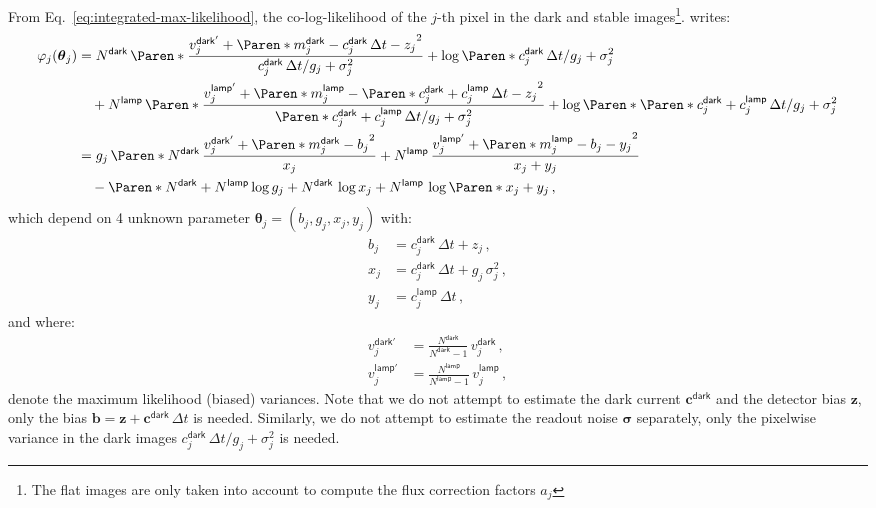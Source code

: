 \documentclass[a4paper,11pt,twoside]{scrartcl}
\newcommand*{\Tag}[1]{\mathsf{#1}}
\newcommand*{\V}[1]{\boldsymbol{#1}}   %
\theoremstyle{plain} %
\theoremstyle{definition}
\theoremstyle{remark}
\begin{document}
From Eq.~\eqref{eq:integrated-max-likelihood}, the co-log-likelihood of the
$j$-th pixel in the dark and stable images\footnote{The flat images are only
  taken into account to compute the flux correction factors $a_j$}. writes:
\begin{align}
  \varphi_j(\V\theta_j)
  &= N^\Tag{dark}\,\Paren*{
    \frac{
      v^\Tag{dark'}_j +
      \Paren*{m^\Tag{dark}_j - c^\Tag{dark}_j\,\Delta t - z_j}^2
    }{
      c^\Tag{dark}_j\,\Delta t/g_j + \sigma^2_j
    }
    + \log\Paren*{c^\Tag{dark}_j\,\Delta t/g_j + \sigma^2_j}
  } \notag\\
  &\quad+ N^\Tag{lamp}\,\Paren*{
    \frac{
      v^\Tag{lamp'}_j + \Paren*{
        m^\Tag{lamp}_j - \Paren*{c^\Tag{dark}_j + c^\Tag{lamp}_j}\,\Delta t
        - z_j
      }^2
    }{
      \Paren*{c^\Tag{dark}_j + c^\Tag{lamp}_j}\,\Delta t/g_j + \sigma^2_j
    } + \log\Paren*{
      \Paren*{c^\Tag{dark}_j + c^\Tag{lamp}_j}\,\Delta t/g_j + \sigma^2_j}
    } \notag\\
  &= g_j\,\Paren*{
    N^\Tag{dark}\,
    \frac{v^\Tag{dark'}_j + \Paren*{m^\Tag{dark}_j - b_j}^2}{x_j} +
    N^\Tag{lamp}\,
    \frac{v^\Tag{lamp'}_j + \Paren*{m^\Tag{lamp}_j - b_j - y_j}^2}{x_j + y_j}
  } \notag\\
  &\quad - \Paren*{N^\Tag{dark} + N^\Tag{lamp}}\log g_j
    + N^\Tag{dark}\,\log x_j
    + N^\Tag{lamp}\,\log\Paren*{x_j + y_j} \, ,
\end{align}
which depend on 4 unknown parameter $\V\theta_j =  (b_j, g_j, x_j, y_j)$ with:
\begin{align}
   b_j &= c^\Tag{dark}_j\,\Delta t + z_j \,,\\
   x_j &= c^\Tag{dark}_j\,\Delta t + g_j\,\sigma^2_j \,,\\
   y_j &= c^\Tag{lamp}_j\,\Delta t \,,
\end{align}
and where:
\begin{align}
  v^\Tag{dark'}_j
  &= \frac{N^\Tag{dark}}{N^\Tag{dark} - 1}\,v^\Tag{dark}_j\,,\\
  v^\Tag{lamp'}_j
  &= \frac{N^\Tag{lamp}}{N^\Tag{lamp} - 1}\,v^\Tag{lamp}_j\,,
\end{align}
denote the maximum likelihood (biased) variances.  Note that we do not attempt
to estimate the dark current $\V c^\Tag{dark}$ and the detector bias $\V z$,
only the bias $\V b = \V z + \V c^\Tag{dark}\,\Delta t$ is needed. Similarly,
we do not attempt to estimate the readout noise $\V \sigma$ separately, only
the pixelwise variance in the dark images $c^\Tag{dark}_j\,\Delta t/g_j +
\sigma^2_j$ is needed.
\end{document}
